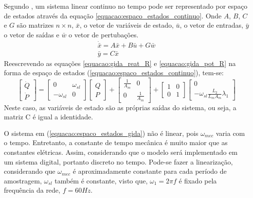 	Segundo , um sistema linear continuo no tempo pode ser representado por espaço de estados através da equação \ref{equacao:espaco_estados_continuo}. Onde $A$, $B$, $C$ e $G$ são matrizes $n \times n$, $\bar{x}$, o vetor de variáveis de estado, $\bar{u}$, o vetor de entradas, $\bar{y}$ o vetor de saídas e $\bar{w}$ o vetor de pertubações.
	\begin{equation}
		\label{equacao:espaco_estados_continuo}
		\begin{split}
			\dot{\bar{x}}=A\bar{x}+B\bar{u}+G\bar{w} \\
			\bar{y}=C\bar{x}
		\end{split}
	\end{equation}
	Reescrevendo as equações \ref{equacao:gida_reat_R} e \ref{equacao:gida_pot_R} na forma de espaço de estados (\ref{equacao:espaco_estados_continuo}), tem-se:
	\begin{equation}
		\label{equacao:espaco_estados_gida}
		\begin{bmatrix}
			\dot{Q} \\ \dot{P}
		\end{bmatrix} =
		\begin{bmatrix}
			0            & \omega_{sl} \\
			-\omega_{sl} & 0
		\end{bmatrix}
		\begin{bmatrix}
			Q \\
			P
		\end{bmatrix} + 
		\begin{bmatrix}
			\frac{1}{A_m} & 0 \\
			0 & \frac{1}{A_m}
		\end{bmatrix} + 
		\begin{bmatrix}
			1 & 0 \\
			0 & 1
		\end{bmatrix}
		\begin{bmatrix}
			0 \\
			-\omega_{sl}\frac{L_2}{L_mA_m}\lambda_1
		\end{bmatrix}
	\end{equation}
	Neste caso, as variáveis de estado são as próprias saídas do sistema, ou seja, a matriz C é igual a identidade.
	
	O sistema em (\ref{equacao:espaco_estados_gida}) não é linear, pois $\omega_{mec}$ varia com o tempo. Entretanto, a constante de tempo mecânica é muito maior que as constantes elétricas. Assim, considerando que o modelo será implementado em um sistema digital, portanto discreto no tempo. Pode-se fazer a linearização, considerando que $\omega_{mec}$ é aproximadamente constante para cada período de amostragem, $\omega_{sl}$ também é constante, visto que, $\omega_1=2\pi f$ é fixado pela frequência da rede, $f=60Hz$. 
	

